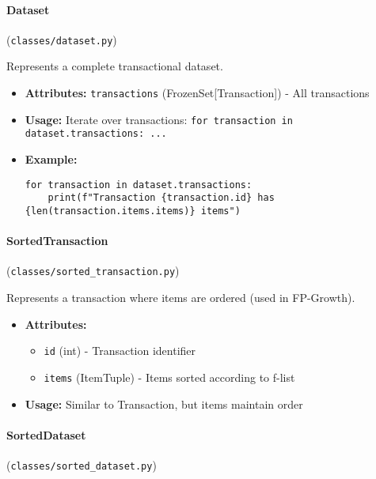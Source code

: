 \documentclass[
english,
smallborders
]{i6prcsht}
\begin{document}
\vspace*{0.3cm}

\paragraph{Dataset} (\texttt{classes/dataset.py})

Represents a complete transactional dataset.

\begin{itemize}
	\item \textbf{Attributes:} \texttt{transactions} (FrozenSet[Transaction]) - All transactions
	\item \textbf{Usage:} Iterate over transactions: \texttt{for transaction in dataset.transactions: ...}
	\item \textbf{Example:}
	      \begin{lstlisting}
for transaction in dataset.transactions:
    print(f"Transaction {transaction.id} has {len(transaction.items.items)} items")
    \end{lstlisting}
\end{itemize}

\vspace*{0.3cm}

\paragraph{SortedTransaction} (\texttt{classes/sorted\_transaction.py})

Represents a transaction where items are ordered (used in FP-Growth).

\begin{itemize}
	\item \textbf{Attributes:}
	      \begin{itemize}
		      \item \texttt{id} (int) - Transaction identifier
		      \item \texttt{items} (ItemTuple) - Items sorted according to f-list
	      \end{itemize}
	\item \textbf{Usage:} Similar to Transaction, but items maintain order
\end{itemize}

\vspace*{0.3cm}

\paragraph{SortedDataset} (\texttt{classes/sorted\_dataset.py})
\end{document}
